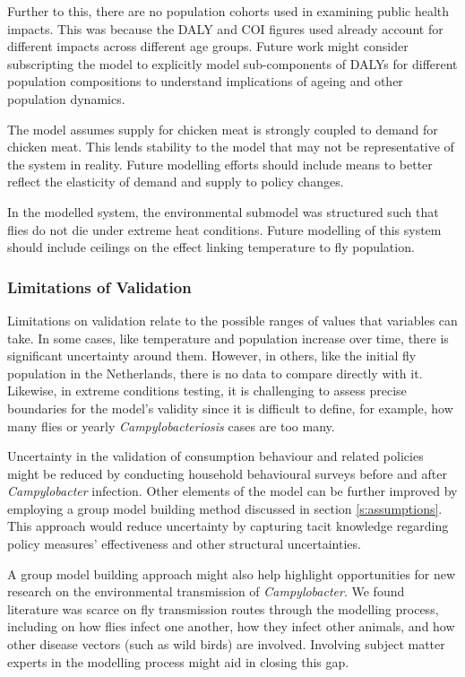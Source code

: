 Further to this, there are no population cohorts used in examining public health impacts. This was because the DALY and COI figures used already account for different impacts across different age groups. Future work might consider subscripting the model to explicitly model sub-components of DALYs for different population compositions to understand implications of ageing and other population dynamics.

The model assumes supply for chicken meat is strongly coupled to demand for chicken meat. This lends stability to the model that may not be representative of the system in reality. Future modelling efforts should include means to better reflect the elasticity of demand and supply to policy changes.

In the modelled system, the environmental submodel was structured such that flies do not die under extreme heat conditions. Future modelling of this system should include ceilings on the effect linking temperature to fly population.

\subsubsection{Limitations of Validation}
Limitations on validation relate to the possible ranges of values that variables can take. In some cases, like temperature and population increase over time, there is significant uncertainty around them. However, in others, like the initial fly population in the Netherlands, there is no data to compare directly with it. Likewise, in extreme conditions testing, it is challenging to assess precise boundaries for the model's validity since it is difficult to define, for example, how many flies or yearly \textit{Campylobacteriosis} cases are too many.

Uncertainty in the validation of consumption behaviour and related policies might be reduced by conducting household behavioural surveys before and after \textit{Campylobacter} infection. Other elements of the model can be further improved by employing a group model building method discussed in section \ref{s:assumptions}. This approach would reduce uncertainty by capturing tacit knowledge regarding policy measures' effectiveness and other structural uncertainties.

A group model building approach might also help highlight opportunities for new research on the environmental transmission of \textit{Campylobacter}. We found literature was scarce on fly transmission routes through the modelling process, including on how flies infect one another, how they infect other animals, and how other disease vectors (such as wild birds) are involved. Involving subject matter experts in the modelling process might aid in closing this gap.

